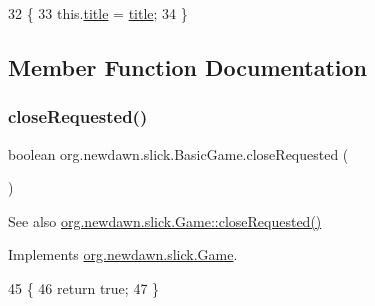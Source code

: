 \begin{DoxyCode}
32                                    \{
33         this.\mbox{\hyperlink{classorg_1_1newdawn_1_1slick_1_1_basic_game_a7d56224aca7f48d84cbd9f1d55cc5a70}{title}} = \mbox{\hyperlink{classorg_1_1newdawn_1_1slick_1_1_basic_game_a7d56224aca7f48d84cbd9f1d55cc5a70}{title}};
34     \}
\end{DoxyCode}


\subsection{Member Function Documentation}
\mbox{\label{classorg_1_1newdawn_1_1slick_1_1_basic_game_a84830b3b65ccbc59e0050f5332bd4a3b}} 
\subsubsection{\texorpdfstring{close\+Requested()}{closeRequested()}}
{\footnotesize\ttfamily boolean org.\+newdawn.\+slick.\+Basic\+Game.\+close\+Requested (\begin{DoxyParamCaption}{ }\end{DoxyParamCaption})\hspace{0.3cm}{\ttfamily [inline]}}

\begin{DoxySeeAlso}{See also}
\mbox{\hyperlink{interfaceorg_1_1newdawn_1_1slick_1_1_game_a186989e6f05f917447c004adfe2f2332}{org.\+newdawn.\+slick.\+Game\+::close\+Requested()}} 
\end{DoxySeeAlso}


Implements \mbox{\hyperlink{interfaceorg_1_1newdawn_1_1slick_1_1_game_a186989e6f05f917447c004adfe2f2332}{org.\+newdawn.\+slick.\+Game}}.


\begin{DoxyCode}
45                                     \{
46         \textcolor{keywordflow}{return} \textcolor{keyword}{true};
47     \}
\end{DoxyCode}
\mbox{\label{classorg_1_1newdawn_1_1slick_1_1_basic_game_a9d83c85e4046945a3459debf55079697}} 
